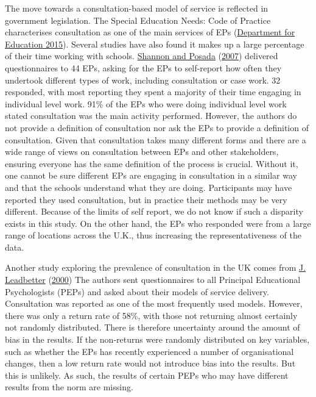 \documentclass[
]{article}
\begin{document}
The move towards a consultation-based model of service is reflected in
government legislation. The Special Education Needs: Code of Practice
characterises consultation as one of the main services of EPs
(\protect\hyperlink{ref-departmentforeducationSENDCodePractice2015}{Department
for Education 2015}). Several studies have also found it makes up a
large percentage of their time working with schools.
\protect\hyperlink{ref-shannonEducationalPsychologistEarly2007}{Shannon
and Posada}
(\protect\hyperlink{ref-shannonEducationalPsychologistEarly2007}{2007})
delivered questionnaires to 44 EPs, asking for the EPs to self-report
how often they undertook different types of work, including consultation
or case work. 32 responded, with most reporting they spent a majority of
their time engaging in individual level work. 91\% of the EPs who were
doing individual level work stated consultation was the main activity
performed. However, the authors do not provide a definition of
consultation nor ask the EPs to provide a definition of consultation.
Given that consultation takes many different forms and there are a wide
range of views on consultation between EPs and other stakeholders,
ensuring everyone has the same definition of the process is crucial.
Without it, one cannot be sure different EPs are engaging in
consultation in a similar way and that the schools understand what they
are doing. Participants may have reported they used consultation, but in
practice their methods may be very different. Because of the limits of
self report, we do not know if such a disparity exists in this study. On
the other hand, the EPs who responded were from a large range of
locations across the U.K., thus increasing the representativeness of the
data.

Another study exploring the prevalence of consultation in the UK comes
from \protect\hyperlink{ref-leadbetterPatternsServiceDelivery2000}{J.
Leadbetter}
(\protect\hyperlink{ref-leadbetterPatternsServiceDelivery2000}{2000})
The authors sent questionnaires to all Principal Educational
Psychologists (PEPs) and asked about their models of service delivery.
Consultation was reported as one of the most frequently used models.
However, there was only a return rate of 58\%, with those not returning
almost certainly not randomly distributed. There is therefore
uncertainty around the amount of bias in the results. If the non-returns
were randomly distributed on key variables, such as whether the EPs has
recently experienced a number of organisational changes, then a low
return rate would not introduce bias into the results. But this is
unlikely. As such, the results of certain PEPs who may have different
results from the norm are missing.
\end{document}
